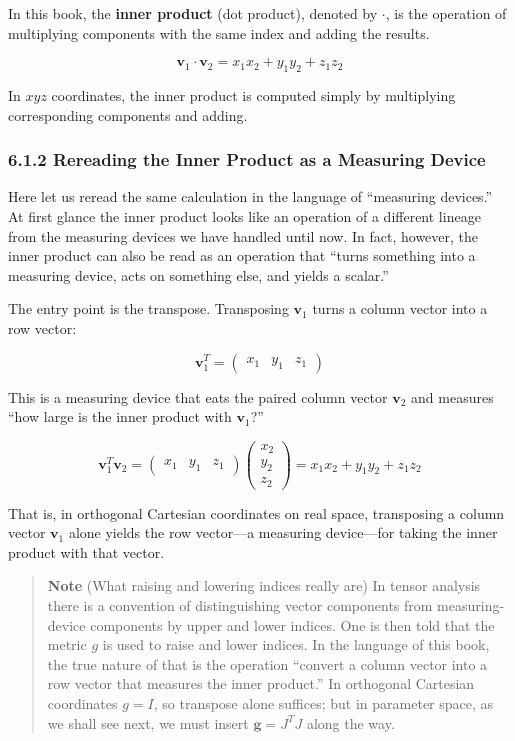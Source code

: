In this book, the \textbf{inner product} (dot product), denoted by
\(\cdot\), is the operation of multiplying components with the same
index and adding the results.

\[\mathbf{v}_1 \cdot \mathbf{v}_2 = x_1 x_2 + y_1 y_2 + z_1 z_2\]

In \(xyz\) coordinates, the inner product is computed simply by
multiplying corresponding components and adding.

\hypertarget{rereading-the-inner-product-as-a-measuring-device}{%
\subsubsection{6.1.2 Rereading the Inner Product as a Measuring
Device}\label{rereading-the-inner-product-as-a-measuring-device}}

Here let us reread the same calculation in the language of ``measuring
devices.'' At first glance the inner product looks like an operation of
a different lineage from the measuring devices we have handled until
now. In fact, however, the inner product can also be read as an
operation that ``turns something into a measuring device, acts on
something else, and yields a scalar.''

The entry point is the transpose. Transposing \(\mathbf{v}_1\) turns a
column vector into a row vector:

\[\mathbf{v}_1^T = \begin{pmatrix} x_1 & y_1 & z_1 \end{pmatrix}\]

This is a measuring device that eats the paired column vector
\(\mathbf{v}_2\) and measures ``how large is the inner product with
\(\mathbf{v}_1\)?''

\[\mathbf{v}_1^T\mathbf{v}_2
= \begin{pmatrix} x_1 & y_1 & z_1 \end{pmatrix}
\begin{pmatrix} x_2 \\ y_2 \\ z_2 \end{pmatrix}
= x_1x_2 + y_1y_2 + z_1z_2\]

That is, in orthogonal Cartesian coordinates on real space, transposing
a column vector \(\mathbf{v}_1\) alone yields the row vector---a
measuring device---for taking the inner product with that vector.

\begin{quote}
\textbf{Note} (What raising and lowering indices really are) In tensor
analysis there is a convention of distinguishing vector components from
measuring-device components by upper and lower indices. One is then told
that the metric \(g\) is used to raise and lower indices. In the
language of this book, the true nature of that is the operation
``convert a column vector into a row vector that measures the inner
product.'' In orthogonal Cartesian coordinates \(g=I\), so transpose
alone suffices; but in parameter space, as we shall see next, we must
insert \(\mathbf{g}=J^T J\) along the way.
\end{quote}

